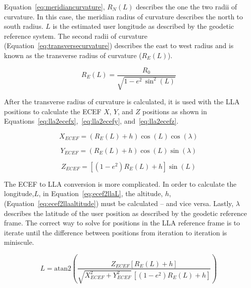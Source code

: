 Equation~\ref{eq:meridiancurvature}, \(R_N (L)\) describes the one the two radii of curvature. In this case, the meridian radius of curvature describes the north to south radius. \(L\) is the estimated user longitude as described by the geodetic reference system. The second radii of curvature (Equation~\ref{eq:transversecurvature}) describes the east to west radius and is known as the transverse radius of curvature (\(R_E (L) \)).

\begin{equation}\label{eq:transversecurvature}
    R_E (L) = \frac{R_0}{\sqrt{1 - e^2 \, \sin^2 {\left(L\right)}}}
\end{equation}

After the transverse radius of curvature is calculated, it is used with the LLA positions to calculate the ECEF \(X\), \(Y\), and \(Z\) positions as shown in Equations~\ref{eq:lla2ecefx},~\ref{eq:lla2ecefy}, and~\ref{eq:lla2ecefz}.

\begin{equation}\label{eq:lla2ecefx}
    X_{ECEF} = \left(R_E (L) + h\right)\cos \left(L\right)\cos \left(\lambda\right)
\end{equation}

\begin{equation}\label{eq:lla2ecefy}
    Y_{ECEF} = \left(R_E (L) + h\right)\cos \left(L\right)\sin \left(\lambda\right)
\end{equation}

\begin{equation}\label{eq:lla2ecefz}
    Z_{ECEF} = \left[\left(1 - e^2\right) R_E (L) + h\right] \sin \left(L\right)
\end{equation}

The ECEF to LLA conversion is more complicated. In order to calculate the longitude,\(L\), in Equation~\ref{eq:ecef2llaL}, the altitude, \(h\), (Equation~\ref{eq:ecef2llaaltitude}) must be calculated {--} and vice versa. Lastly, \(\lambda \) describes the latitude of the user position as described by the geodetic reference frame. The correct way to solve for positions in the LLA reference frame is to iterate until the difference between positions from iteration to iteration is miniscule.

\begin{equation}\label{eq:ecef2llaL}
    L = \textrm{atan2}\left(\frac{Z_{ECEF} \left[R_E (L) + h\right]}{\sqrt{X_{ECEF}^2 + Y^2_{ECEF}} \, \left[ \left(1 - e^2\right) R_E (L) + h\right]}\right)
\end{equation}

